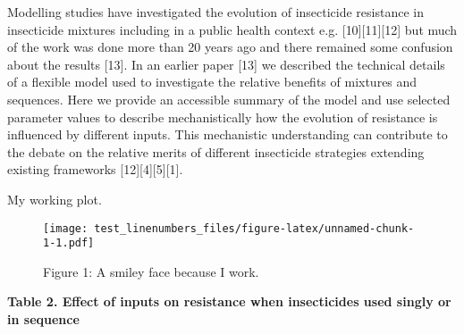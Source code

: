 \documentclass[11pt,]{article}
\begin{document}
Modelling studies have investigated the evolution of insecticide
resistance in insecticide mixtures including in a public health context
e.g. {[}10{]}{[}11{]}{[}12{]} but much of the work was done more than 20
years ago and there remained some confusion about the results {[}13{]}.
In an earlier paper {[}13{]} we described the technical details of a
flexible model used to investigate the relative benefits of mixtures and
sequences. Here we provide an accessible summary of the model and use
selected parameter values to describe mechanistically how the evolution
of resistance is influenced by different inputs. This mechanistic
understanding can contribute to the debate on the relative merits of
different insecticide strategies extending existing frameworks
{[}12{]}{[}4{]}{[}5{]}{[}1{]}.

My working plot.

\begin{figure}[htbp]
\centering
\texttt{[image: test\_linenumbers\_files/figure-latex/unnamed-chunk-1-1.pdf]}
\caption{Figure 1: A smiley face because I work.}
\end{figure}

\textbf{Table 2. Effect of inputs on resistance when insecticides used
singly or in sequence}
\end{document}
